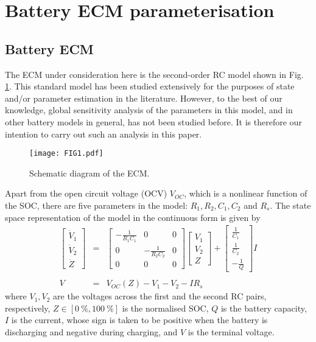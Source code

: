 \documentclass[letterpaper,twocolumn]{IEEEtran}
\begin{document}
\section{Battery ECM parameterisation}

\subsection{Battery ECM}
The ECM under consideration here is the second-order RC model shown in Fig. \ref{fig:Figure1}. This standard model has been studied extensively for the purposes of state and/or parameter estimation in the literature. However, to the best of our knowledge, global sensitivity analysis of the parameters in this model, and in other battery models in general, has not been studied before. It is therefore our intention to carry out such an analysis in this paper.

\begin{figure}
\centering
\texttt{[image: FIG1.pdf]}
\caption{Schematic diagram of the ECM.}
\label{fig:Figure1}
\end{figure}

Apart from the open circuit voltage (OCV) $V_{OC}$, which is a nonlinear function of the SOC, there are five parameters in the model: $R_1,R_2,C_1,C_2$ and $R_s$.
 The state space representation of the model in the continuous form is given by
\begin{subequations}\label{sys:02}
\begin{eqnarray}
\begin{bmatrix} \dot{V}_1 \\ \dot{V}_2 \\ \dot{Z} \end{bmatrix} &=&  \begin{bmatrix} -\frac{1}{R_1 C_1} & 0 & 0 \\ 0 & -\frac{1}{R_2 C_2} & 0 \\ 0 & 0 & 0 \end{bmatrix} \begin{bmatrix} V_1 \\ V_2 \\ Z \end{bmatrix} + \begin{bmatrix} \frac{1}{C_1} \\ \frac{1}{C_2} \\ -\frac{1}{Q}\end{bmatrix} I  \label{sys:02a} \nonumber \\
  \\
  V &=& V_{OC}(Z) - V_1 - V_2 - I R_s \label{sys:02b}
\end{eqnarray}
\end{subequations}
where $V_1,V_2$ are the voltages across the first and the second RC pairs, respectively, $Z \in [\SI{0}{\percent},\SI{100}{\percent}]$ is the normalised SOC, $Q$ is the battery capacity, $I$ is the current, whose sign is taken to be positive when the battery is discharging and negative during charging, and $V$ is the terminal voltage.
\end{document}
